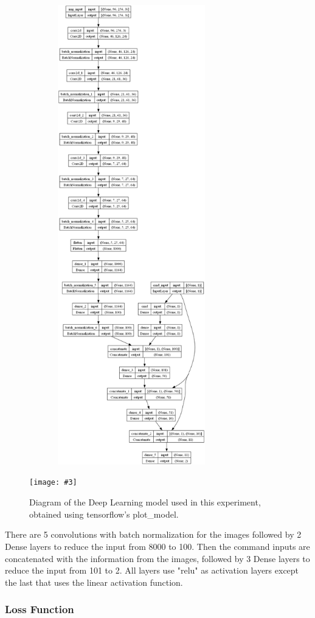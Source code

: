 \documentclass[12pt]{report}
\newcommand\insertfigure[5]{
\begin{figure}[#1]
\begin{center}
\texttt{[image: \#3]}
\end{center}
\caption{#4}
\label{#5}
\end{figure}
}
\begin{document}
\includegraphics[width=11cm, height=20cm]{cnn_model.png}
\insertfigure{th}{0\textwidth}{cnn_model1.png}{Diagram of the Deep Learning model used in this experiment, obtained using tensorflow's plot\_model.}{fig:cnn}

There are 5 convolutions with batch normalization for the images followed by 2 Dense layers to reduce the input from 8000 to 100. Then the command inputs are concatenated with the information from the images, followed by 3 Dense layers to reduce the input from 101 to 2. All layers use "relu" as activation layers except the last that uses the linear activation function.

\subsubsection{Loss Function}
\end{document}
